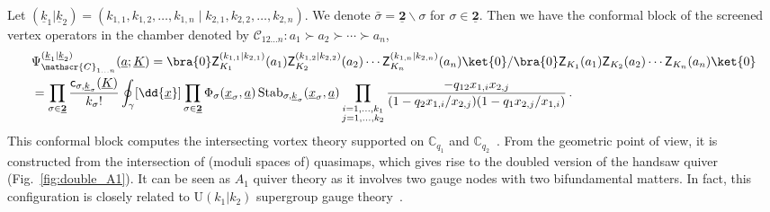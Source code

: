 Let $(\underline{k}_1|\underline{k}_2) = (k_{1,1},k_{1,2},\ldots,k_{1,n} \mid k_{2,1},k_{2,2},\ldots,k_{2,n})$.
We denote $\bar{\sigma} = \underline{\mathbf{2}} \backslash \sigma$ for $\sigma \in \underline{\mathbf{2}}$.
Then we have the conformal block of the screened vertex operators in the chamber denoted by $\mathscr{C}_{12\ldots n}: a_1 \succ a_2 \succ \cdots \succ a_n$,
\begin{align}
    & \Psi_{\mathscr{C}_{1\ldots n}}^{(\underline{k}_1|\underline{k}_2)}(\underline{a};\underline{K}) = \bra{0} \mathsf{Z}^{(k_{1,1}|k_{2,1})}_{K_1}(a_1) \mathsf{Z}^{(k_{1,2}|k_{2,2})}_{K_2}(a_2) \cdots \mathsf{Z}^{(k_{1,n}|k_{2,n})}_{K_n}(a_n) \ket{0} / \bra{0} \mathsf{Z}_{K_1}(a_1) \mathsf{Z}_{K_2}(a_2) \cdots \mathsf{Z}_{K_n}(a_n) \ket{0}
    \nonumber \\ 
    & = \prod_{\sigma \in \underline{\mathbf{2}}} \frac{\mathsf{c}_{\sigma,\underline{k}_\sigma}(\underline{K})}{k_\sigma!} \oint_\gamma [\dd{\underline{x}}] \prod_{\sigma \in \underline{\mathbf{2}}} \Phi_{\sigma}(\underline{x}_\sigma,\underline{a}) \operatorname{Stab}_{\sigma,{\underline{k}}_\sigma}(\underline{x}_\sigma,\underline{a}) 
    \prod_{\substack{i=1,\ldots,k_1 \\ j = 1,\ldots,k_2}}\frac{-q_{12} x_{1,i} x_{2,j}}{(1 - q_2 x_{1,i}/x_{2,j})(1 - q_1 x_{2,j}/x_{1,i})}
    \, .
\end{align}    
This conformal block computes the intersecting vortex theory supported on $\mathbb{C}_{q_1}$ and $\mathbb{C}_{q_2}$~\cite{Gomis:2016ljm,Pan:2016fbl,Kimura:2021ngu}.
From the geometric point of view, it is constructed from the intersection of (moduli spaces of) quasimaps, which gives rise to the doubled version of the handsaw quiver (Fig.~\ref{fig:double_A1}).
It can be seen as $\widehat{A}_1$ quiver theory as it involves two gauge nodes with two bifundamental matters.
In fact, this configuration is closely related to $\mathrm{U}(k_1|k_2)$ supergroup gauge theory~\cite{Kimura:2019msw,Kimura:2023iup}.

